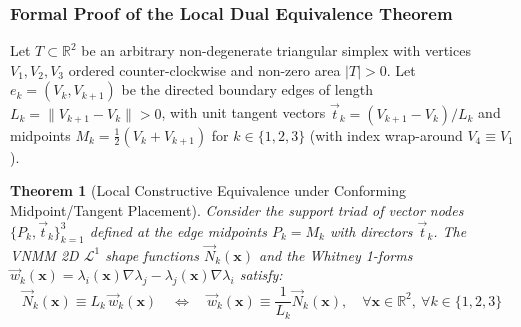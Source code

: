 \documentclass[preprint,12pt]{elsarticle}
\newtheorem{theorem}{Theorem}
\begin{document}
\subsubsection{Formal Proof of the Local Dual Equivalence Theorem}
\label{subsubsec:formal_proof_dual_whitney}
Let $T \subset \mathbb{R}^2$ be an arbitrary non-degenerate triangular simplex with vertices $V_1, V_2, V_3$ ordered counter-clockwise and non-zero area $|T| > 0$. Let $e_k = (V_k, V_{k+1})$ be the directed boundary edges of length $L_k = \|V_{k+1} - V_k\| > 0$, with unit tangent vectors $\vec{t}_k = (V_{k+1} - V_k)/L_k$ and midpoints $M_k = \frac{1}{2}(V_k + V_{k+1})$ for $k \in \{1, 2, 3\}$ (with index wrap-around $V_4 \equiv V_1$).

\begin{theorem}[Local Constructive Equivalence under Conforming Midpoint/Tangent Placement]
Consider the support triad of vector nodes $\{P_k, \vec{t}_k\}_{k=1}^3$ defined at the edge midpoints $P_k = M_k$ with directors $\vec{t}_k$. The VNMM 2D $\mathcal{L}^1$ shape functions $\vec{N}_k(\mathbf{x})$ and the Whitney 1-forms $\vec{w}_k(\mathbf{x}) = \lambda_i(\mathbf{x})\nabla\lambda_j - \lambda_j(\mathbf{x})\nabla\lambda_i$ satisfy:
\begin{equation}
\vec{N}_k(\mathbf{x}) \equiv L_k \, \vec{w}_k(\mathbf{x}) \quad \Longleftrightarrow \quad \vec{w}_k(\mathbf{x}) \equiv \frac{1}{L_k} \vec{N}_k(\mathbf{x}), \quad \forall \mathbf{x} \in \mathbb{R}^2, \ \forall k \in \{1, 2, 3\}
\label{eq:dual_equivalence_scaling}
\end{equation}
\end{theorem}
\end{document}
